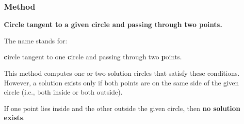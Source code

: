 
\begin{center}
\end{center}

\subsubsection{Method }
\label{ssub:method_c__c__pp}

\textbf{Circle tangent to a given circle and passing through two points.}

\medskip
\noindent
The name  stands for:

\begin{center}
\textbf{c}ircle tangent to one \textbf{c}ircle and passing through two \textbf{p}oints.
\end{center}

\noindent
This method computes one or two solution circles that satisfy these conditions.
However, a solution exists only if both points are on the same side of the given circle (i.e., both inside or both outside).

\medskip
\noindent
If one point lies inside and the other outside the given circle, then \textbf{no solution exists}.

\vspace{1em}


